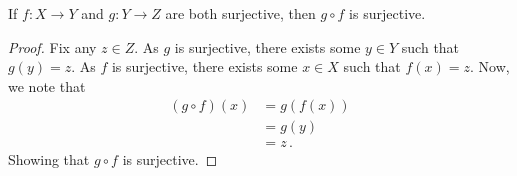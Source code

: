 \guard




\begin{prop}
\label{prop:compositionOfSurjectionIsSurjection}
  If $f:X\to Y$ and $g:Y\to Z$ are both surjective, then $g\circ f$ is surjective.
\end{prop}
\begin{proof}
  Fix any $z\in Z$.
  As $g$ is surjective, there exists some $y\in Y$ such that $g(y)=z$.
  As $f$ is surjective, there exists some $x\in X$ such that $f(x)=z$.
  Now, we note that
  \begin{align*}
    (g\circ f)(x) &= g(f(x)) \\
                  &= g(y) \\
                  &= z\,.
  \end{align*}
  Showing that $g\circ f$ is surjective.
\end{proof}
